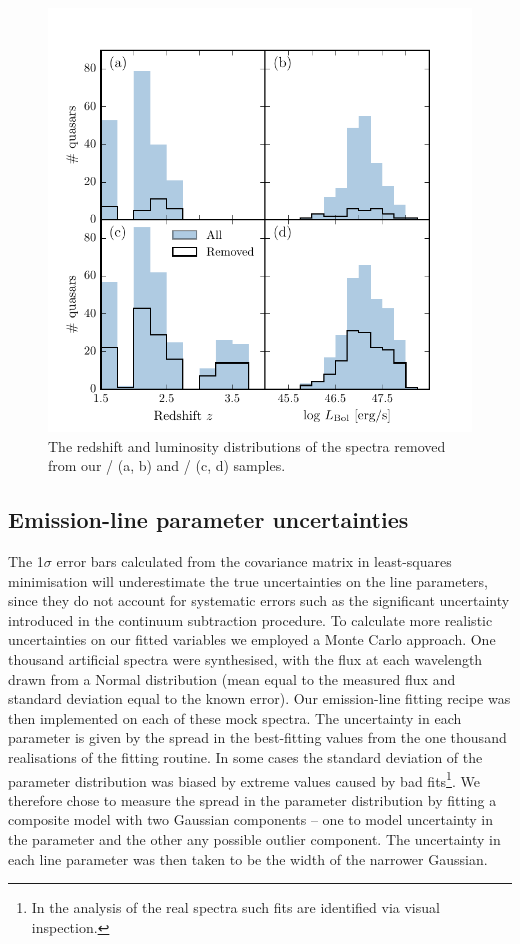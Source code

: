 \begin{figure}
    \includegraphics[width=\textwidth]{figures/chapter03/flagged_spectra.pdf} 
    \caption{The redshift and luminosity distributions of the spectra removed from our \hans/ (a, b) and \hbns/ (c, d) samples.} 
    \label{fig:flagged_spectra}
\end{figure}

\subsection{Emission-line parameter uncertainties}

The 1$\sigma$ error bars calculated from the covariance matrix in least-squares minimisation will underestimate the true uncertainties on the line parameters, since they do not account for systematic errors such as the significant uncertainty introduced in the continuum subtraction procedure.  
To calculate more realistic uncertainties on our fitted variables we employed a Monte Carlo approach. 
One thousand artificial spectra were synthesised, with the flux at each wavelength drawn from a Normal distribution (mean equal to the measured flux and standard deviation equal to the known error).
Our emission-line fitting recipe was then implemented on each of these mock spectra. 
The uncertainty in each parameter is given by the spread in the best-fitting values from the one thousand realisations of the fitting routine. 
In some cases the standard deviation of the parameter distribution was biased by extreme values caused by bad fits\footnote{In the analysis of the real spectra such fits are identified via visual inspection.}. 
We therefore chose to measure the spread in the parameter distribution by fitting a composite model with two Gaussian components -- one to model uncertainty in the parameter and the other any possible outlier component. 
The uncertainty in each line parameter was then taken to be the width of the narrower Gaussian. 

